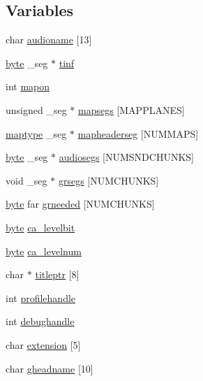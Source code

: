 \subsection*{Variables}
\begin{DoxyCompactItemize}
\item 
char \hyperlink{ID__CA_8H_aedfaf0a69707063299a02a1af291edc1}{audioname} \mbox{[}13\mbox{]}
\item 
\hyperlink{ID__HEAD_8H_a0c8186d9b9b7880309c27230bbb5e69d}{byte} \_\-seg $\ast$ \hyperlink{ID__CA_8H_ac7ecffe82882a03457d1244cff842063}{tinf}
\item 
int \hyperlink{ID__CA_8H_a9bc2aa6f5318e11111d85d1f526f4ed9}{mapon}
\item 
unsigned \_\-seg $\ast$ \hyperlink{ID__CA_8H_aa491c919acbb7c3a3626dc79014b7b7b}{mapsegs} \mbox{[}MAPPLANES\mbox{]}
\item 
\hyperlink{structmaptype}{maptype} \_\-seg $\ast$ \hyperlink{ID__CA_8H_a4fa58ff79559a7ff81611311489c8e70}{mapheaderseg} \mbox{[}NUMMAPS\mbox{]}
\item 
\hyperlink{ID__HEAD_8H_a0c8186d9b9b7880309c27230bbb5e69d}{byte} \_\-seg $\ast$ \hyperlink{ID__CA_8H_a6a31b9ada480b861c1ed6f0276bda609}{audiosegs} \mbox{[}NUMSNDCHUNKS\mbox{]}
\item 
void \_\-seg $\ast$ \hyperlink{ID__CA_8H_aa0e5c34b0901c8cc15a60fe57cb09b3a}{grsegs} \mbox{[}NUMCHUNKS\mbox{]}
\item 
\hyperlink{ID__HEAD_8H_a0c8186d9b9b7880309c27230bbb5e69d}{byte} far \hyperlink{ID__CA_8H_aff6ae5a74b0467508c14a3f3b91ffd90}{grneeded} \mbox{[}NUMCHUNKS\mbox{]}
\item 
\hyperlink{ID__HEAD_8H_a0c8186d9b9b7880309c27230bbb5e69d}{byte} \hyperlink{ID__CA_8H_af4f718356e28be31a81ef4df1a2f7c96}{ca\_\-levelbit}
\item 
\hyperlink{ID__HEAD_8H_a0c8186d9b9b7880309c27230bbb5e69d}{byte} \hyperlink{ID__CA_8H_a2010805bcd6b7bda525f99d095cbf380}{ca\_\-levelnum}
\item 
char $\ast$ \hyperlink{ID__CA_8H_af1ed970c746cb7febb0ea61900dddb58}{titleptr} \mbox{[}8\mbox{]}
\item 
int \hyperlink{ID__CA_8H_ad1a5984b9f9fb82e3d9fdc3e79bdb5d0}{profilehandle}
\item 
int \hyperlink{ID__CA_8H_a63f7bed9e587f57ce6912f20d2fb4f87}{debughandle}
\item 
char \hyperlink{ID__CA_8H_ab39923c10c51a08b6520566a47b307b5}{extension} \mbox{[}5\mbox{]}
\item 
char \hyperlink{ID__CA_8H_acc0b8597a65fbc2db1d9085f2155322f}{gheadname} \mbox{[}10\mbox{]}

\end{DoxyCompactItemize}
